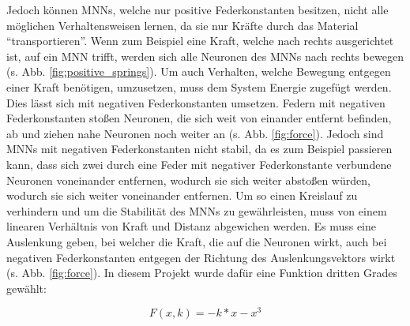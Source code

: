 Jedoch können MNNs, welche nur positive Federkonstanten besitzen, nicht alle möglichen Verhaltensweisen lernen, da sie nur Kräfte durch das Material \enquote{transportieren}.
Wenn zum Beispiel eine Kraft, welche nach rechts ausgerichtet ist, auf ein MNN trifft, werden sich alle Neuronen des MNNs nach rechts bewegen (s. Abb. \ref{fig:positive_springs}).
Um auch Verhalten, welche Bewegung entgegen einer Kraft benötigen, umzusetzen, muss dem System Energie zugefügt werden. Dies lässt sich mit negativen Federkonstanten umsetzen. 
Federn mit negativen Federkonstanten stoßen Neuronen, die sich weit von einander entfernt befinden, ab und ziehen nahe Neuronen noch weiter an (s. Abb. \ref{fig:force}).
Jedoch sind MNNs mit negativen Federkonstanten nicht stabil, da es zum Beispiel passieren kann, dass sich zwei durch eine Feder mit negativer Federkonstante verbundene Neuronen voneinander entfernen, wodurch sie sich weiter abstoßen würden, wodurch sie sich weiter voneinander entfernen.
Um so einen Kreislauf zu verhindern und um die Stabilität des MNNs zu gewährleisten, muss von einem linearen Verhältnis von Kraft und Distanz abgewichen werden.
Es muss eine Auslenkung geben, bei welcher die Kraft, die auf die Neuronen wirkt, auch bei negativen Federkonstanten entgegen der Richtung des Auslenkungsvektors wirkt (s. Abb. \ref{fig:force}). In diesem Projekt wurde dafür eine Funktion dritten Grades gewählt:

{\[
    F(x, k) = -k *  x -  x^3
\]}


